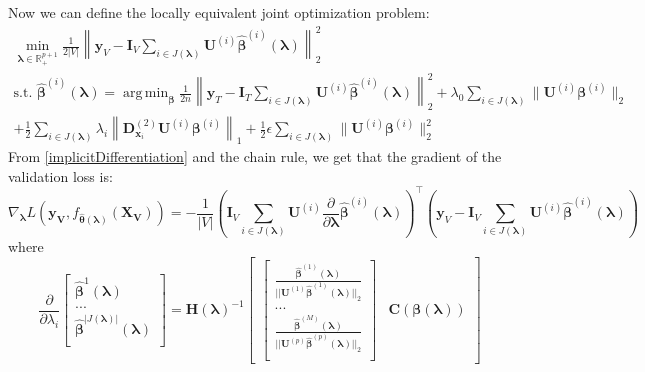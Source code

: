 \documentclass[12pt]{article}
\DeclareMathOperator*{\argmin}{arg\,min}
\begin{document}
Now we can define the locally equivalent joint optimization problem:
\begin{equation}
\begin{array}{c}
\min_{\boldsymbol{\lambda} \in \mathbb{R}^{p+1}_{+}}
\frac{1}{2|V|} \left \| \boldsymbol{y}_V
- \boldsymbol{I}_V \sum_{i\in J(\boldsymbol\lambda)} \boldsymbol {U}^{(i)} \hat{\boldsymbol{\beta}}^{(i)}(\boldsymbol{\lambda})
 \right \|^2_2 \\
\text{s.t. }
\hat{\boldsymbol{\beta}}^{(i)}(\boldsymbol{\lambda}) = \argmin_{\boldsymbol \beta}
\frac{1}{2n} \left \| \boldsymbol{y}_T
- \boldsymbol{I}_T \sum_{i\in J(\boldsymbol\lambda)} \boldsymbol {U}^{(i)} \hat{\boldsymbol{\beta}}^{(i)}(\boldsymbol{\lambda})
\right \|^2_2
+ \lambda_0 \sum_{i\in J(\boldsymbol\lambda)}  \| \boldsymbol {U}^{(i)} \boldsymbol{\beta}^{(i)} \|_2 \\
+ \frac{1}{2} \sum_{i\in J(\boldsymbol\lambda)} \lambda_i \left \| \boldsymbol{D}^{(2)}_{\boldsymbol{x}_i} \boldsymbol {U}^{(i)} \boldsymbol{\beta}^{(i)} \right \|_1
+ \frac{1}{2} \epsilon \sum_{i\in J(\boldsymbol\lambda)} \| \boldsymbol {U}^{(i)} \boldsymbol{\beta}^{(i)} \|_2^2
\end{array}
\end{equation}
From \eqref{implicitDifferentiation} and the chain rule, we get that the gradient of the validation loss is:
\begin{equation}
\nabla_{\boldsymbol \lambda} L(\boldsymbol{y_V}, f_{\hat{\boldsymbol{\theta}}(\boldsymbol{\lambda})}(\boldsymbol{X_V})) =
- \frac{1}{|V|}
\left (
\boldsymbol{I}_V \sum_{i\in J(\boldsymbol\lambda)}  \boldsymbol {U}^{(i)} \frac{\partial}{\partial \boldsymbol\lambda} \hat{\boldsymbol{\beta}}^{(i)}(\boldsymbol{\lambda})
\right )^\top
\left (
\boldsymbol{y}_V - \boldsymbol{I}_V \sum_{i\in J(\boldsymbol\lambda)} \boldsymbol {U}^{(i)} \hat{\boldsymbol{\beta}}^{(i)} (\boldsymbol\lambda)
\right )
\end{equation}
where
\begin{equation}
\frac{\partial}{\partial \lambda_i} 
\begin{bmatrix}
\hat{\boldsymbol{\beta}}^{1}(\boldsymbol{\lambda})\\
...\\
\hat{\boldsymbol{\beta}}^{|J(\boldsymbol{\lambda})|}(\boldsymbol{\lambda})\\
\end{bmatrix}
= 
\boldsymbol{H}(\boldsymbol\lambda)^{-1}
\begin{bmatrix}
\begin{bmatrix}
\frac{\hat{\boldsymbol{\beta}}^{(1)}(\boldsymbol \lambda)}{||\boldsymbol {U}^{(1)}  \hat{\boldsymbol{\beta}}^{(1)} (\boldsymbol \lambda)||_2}\\
...\\
\frac{\hat{\boldsymbol \beta}^{(M)} (\boldsymbol \lambda)}{||\boldsymbol {U}^{(p)}  \hat{\boldsymbol{\beta}}^{(p)}(\boldsymbol \lambda)||_2}\\
\end{bmatrix}
&
\boldsymbol C(\boldsymbol \beta( \boldsymbol \lambda))
\end{bmatrix}
\label{eq:additive_gradient}
\end{equation}
\end{document}
